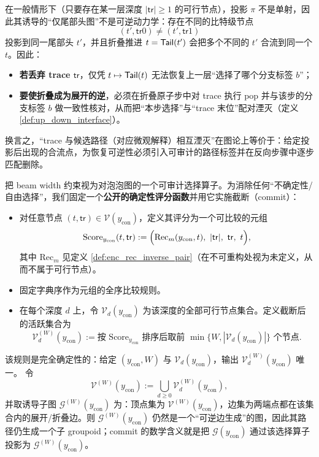 \begin{proposition}\label{prop:log_needed_for_reversibility}
在一般情形下（只要存在某一层深度 \(|\mathsf{tr}|\ge 1\) 的可行节点），投影 \(\pi\) 不是单射，因此其诱导的“仅尾部头图”不是可逆动力学：存在不同的比特级节点
$$
(t',\mathsf{tr}0)\neq (t',\mathsf{tr}1)
$$
投影到同一尾部头 \(t'\)，并且折叠推进 \(t=\mathsf{Tail}(t')\) 会把多个不同的 \(t'\) 合流到同一个 \(t\)。因此：
\begin{itemize}
  \item \textbf{若丢弃 trace \(\mathsf{tr}\)}，仅凭 \(t\mapsto \mathsf{Tail}(t)\) 无法恢复上一层“选择了哪个分支标签 \(b\)”；
  \item \textbf{要使折叠成为展开的逆}，必须在折叠原子步中对 trace 执行 pop 并与该步的分支标签 \(b\) 做一致性核对，从而把“本步选择”与“trace 末位”配对湮灭（定义 \ref{def:up_down_interface}）。
\end{itemize}
换言之，“trace 与候选路径（对应微观解释）相互湮灭”在图论上等价于：给定投影后出现的合流点，为恢复可逆性必须引入可审计的路径标签并在反向步骤中逐步匹配删除。
\end{proposition}

\begin{definition}\label{def:energy_as_subgroupoid_selector}
把 beam width 约束视为对泡泡图的一个可审计选择算子。为消除任何“不确定性/自由选择”，我们固定一个\textbf{公开的确定性评分函数}并用它实施截断（commit）：
\begin{itemize}
  \item 对任意节点 \((t,\mathsf{tr})\in\mathcal V(y_{\mathrm{con}})\)，定义其评分为一个可比较的元组
  $$
  \mathrm{Score}_{y_{\mathrm{con}}}(t,\mathsf{tr})
  :=
  \Bigl(\mathrm{Rec}_m(y_{\mathrm{con}},t),\ |\mathsf{tr}|,\ \mathsf{tr},\ t\Bigr),
  $$
  其中 \(\mathrm{Rec}_m\) 见定义 \ref{def:enc_rec_inverse_pair}（在不可重构处视为未定义，从而不属于可行节点）。
  \item 固定字典序作为元组的全序比较规则。
  \item 在每个深度 \(d\) 上，令 \(\mathcal V_d(y_{\mathrm{con}})\) 为该深度的全部可行节点集合。定义截断后的活跃集合为
  $$
  \mathcal V_d^{(W)}(y_{\mathrm{con}}):=\text{按 }\mathrm{Score}_{y_{\mathrm{con}}}\text{ 排序后取前 }\min\{W,|\mathcal V_d(y_{\mathrm{con}})|\}\text{ 个节点}.
  $$
\end{itemize}
该规则是完全确定性的：给定 \((y_{\mathrm{con}},W)\) 与 \(\mathcal V_d(y_{\mathrm{con}})\)，输出 \(\mathcal V_d^{(W)}(y_{\mathrm{con}})\) 唯一。
令
$$
\mathcal V^{(W)}(y_{\mathrm{con}}):=\bigcup_{d\ge 0}\mathcal V_d^{(W)}(y_{\mathrm{con}}),
$$
并取诱导子图 \(\mathcal G^{(W)}(y_{\mathrm{con}})\) 为：顶点集为 \(\mathcal V^{(W)}(y_{\mathrm{con}})\)，边集为两端点都在该集合内的展开/折叠边。则 \(\mathcal G^{(W)}(y_{\mathrm{con}})\) 仍然是一个“可逆边生成”的图，因此其路径仍生成一个子 groupoid；commit 的数学含义就是把 \(\mathcal G(y_{\mathrm{con}})\) 通过该选择算子投影为 \(\mathcal G^{(W)}(y_{\mathrm{con}})\)。
\end{definition}

